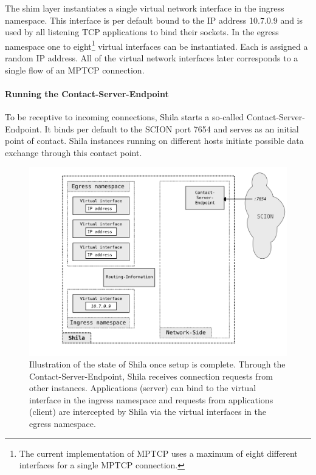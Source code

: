 The shim layer instantiates a single virtual network interface in the ingress namespace. This interface is per default bound to the IP address {\footnotesize 10.7.0.9} and is used by all listening TCP applications to bind their sockets. In the egress namespace one to eight\footnote{The current implementation of MPTCP uses a maximum of eight different interfaces for a single MPTCP connection.} virtual interfaces can be instantiated. Each is assigned a random IP address. All of the virtual network interfaces later corresponds to a single flow of an MPTCP connection.

\paragraph{Running the Contact-Server-Endpoint} To be receptive to incoming connections, Shila starts a so-called Contact-Server-Endpoint. It binds per default to the SCION port {\footnotesize 7654} and serves as an initial point of contact. Shila instances running on different hosts initiate possible data exchange through this contact point.

\begin{figure}
	\begin{center}
		\def\svgwidth{1\textwidth}
		\includegraphics[scale=0.2]{../illustrations/shilaIntroduction/StateAfterSetup.pdf}   
		\caption[]{Illustration of the state of Shila once setup is complete. Through the Contact-Server-Endpoint, Shila receives connection requests from other instances. Applications (server) can bind to the virtual interface in the ingress namespace and requests from applications (client) are intercepted by Shila via the virtual interfaces in the egress namespace.}
		\label{fig:ShilaIllustrationStateAfterSetup}
	\end{center}
\end{figure}

